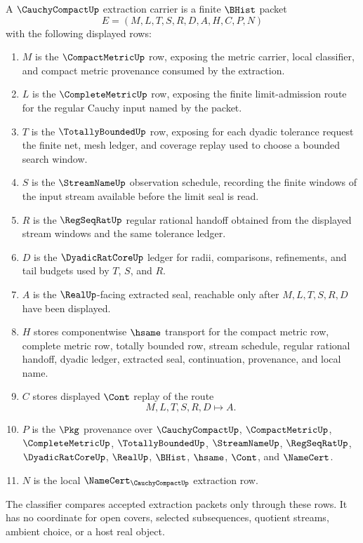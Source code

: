 \begin{definition}
\label{def:cauchy-compact-extraction-carrier}
A $\CauchyCompactUp$ extraction carrier is a finite $\BHist$ packet
$$
E=(M,L,T,S,R,D,A,H,C,P,N)
$$
with the following displayed rows:
\begin{enumerate}
\item $M$ is the $\CompactMetricUp$ row, exposing the metric carrier, local classifier, and compact metric provenance consumed by the extraction.
\item $L$ is the $\CompleteMetricUp$ row, exposing the finite limit-admission route for the regular Cauchy input named by the packet.
\item $T$ is the $\TotallyBoundedUp$ row, exposing for each dyadic tolerance request the finite net, mesh ledger, and coverage replay used to choose a bounded search window.
\item $S$ is the $\StreamNameUp$ observation schedule, recording the finite windows of the input stream available before the limit seal is read.
\item $R$ is the $\RegSeqRatUp$ regular rational handoff obtained from the displayed stream windows and the same tolerance ledger.
\item $D$ is the $\DyadicRatCoreUp$ ledger for radii, comparisons, refinements, and tail budgets used by $T$, $S$, and $R$.
\item $A$ is the $\RealUp$-facing extracted seal, reachable only after $M,L,T,S,R,D$ have been displayed.
\item $H$ stores componentwise $\hsame$ transport for the compact metric row, complete metric row, totally bounded row, stream schedule, regular rational handoff, dyadic ledger, extracted seal, continuation, provenance, and local name.
\item $C$ stores displayed $\Cont$ replay of the route
$$
M,L,T,S,R,D \longmapsto A .
$$
\item $P$ is the $\Pkg$ provenance over $\CauchyCompactUp$, $\CompactMetricUp$, $\CompleteMetricUp$, $\TotallyBoundedUp$, $\StreamNameUp$, $\RegSeqRatUp$, $\DyadicRatCoreUp$, $\RealUp$, $\BHist$, $\hsame$, $\Cont$, and $\NameCert$.
\item $N$ is the local $\NameCert_{\CauchyCompactUp}$ extraction row.
\end{enumerate}
The classifier compares accepted extraction packets only through these rows. It has no coordinate for open covers, selected subsequences, quotient streams, ambient choice, or a host real object.
\end{definition}

